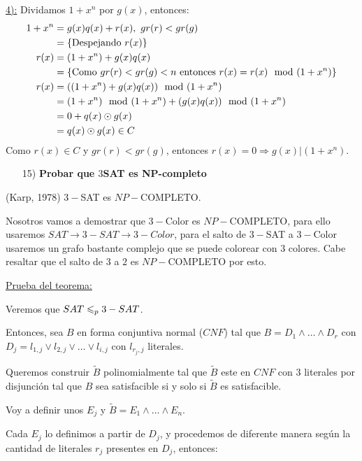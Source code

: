 \documentclass[12pt,a4paper]{article}
\begin{document}
\underline{4):} Dividamos $1+x^{n}$ por $g(x)$, entonces:
\begin{align*}
    1+x^{n} &= g(x)q(x) + r(x),\,\, gr(r) < gr(g)\\
    &=\left\lbrace \text{Despejando $r(x)$} \right\rbrace\\
    r(x) &= (1+x^{n}) + g(x)q(x)\\
    &=\left\lbrace \text{Como $gr(r) < gr(g) < n$ entonces $r(x) = r(x) \mod (1+x^{n})$} \right\rbrace\\
    r(x) &= ((1+x^{n}) + g(x)q(x)) \mod (1+x^{n})\\
    &= (1+x^{n}) \mod (1+x^{n}) + (g(x)q(x)) \mod (1+x^{n})\\
    &= 0 + q(x) \odot g(x)\\
    &= q(x) \odot g(x) \in C
\end{align*}
Como $r(x) \in C$ y $gr(r) < gr(g)$, entonces $r(x) = 0 \Rightarrow g(x)|(1+x^{n})$.

\begin{itemize}
    \item [15)] \textbf{Probar que $3$SAT es NP-completo}
    \label{dem:3sat}
\end{itemize}

\begin{teorema} (Karp, 1978) $3-$SAT es $NP-$COMPLETO.
\end{teorema}

Nosotros vamos a demostrar que $3-$Color es $NP-$COMPLETO, para ello usaremos 
$SAT \to 3-SAT \to 3-Color$, para el salto de $3-$SAT a $3-$Color usaremos 
un grafo bastante complejo que se puede colorear con $3$ colores. Cabe resaltar 
que el salto de $3$ a $2$ es $NP-$COMPLETO por esto.
\medskip

\underline{Prueba del teorema:}
\medskip

Veremos que $SAT \leqslant_{p} 3-SAT$.
\medskip

Entonces, sea $B$ en forma conjuntiva normal ($CNF$) tal que 
$B = D_{1} \wedge \ldots \wedge D_{r}$ con 
$D_{j} = l_{1,j} \vee l_{2,j} \vee \ldots \vee l_{i,j}$ con $l_{r_{j},j}$ literales.
\medskip

Queremos construir $\widetilde{B}$ polinomialmente tal que $\widetilde{B}$ este en
$CNF$ con $3$ literales por disjunción tal que $B$ sea satisfacible si y solo si 
$\widetilde{B}$ es satisfacible.
\medskip

Voy a definir unos $E_{j}$ y $\widetilde{B} = E_{1} \wedge \ldots \wedge E_{n}$.
\medskip

Cada $E_{j}$ lo definimos a partir de $D_{j}$, y procedemos de diferente manera 
según la cantidad de literales $r_{j}$ presentes en $D_{j}$, entonces:
\medskip
\end{document}
